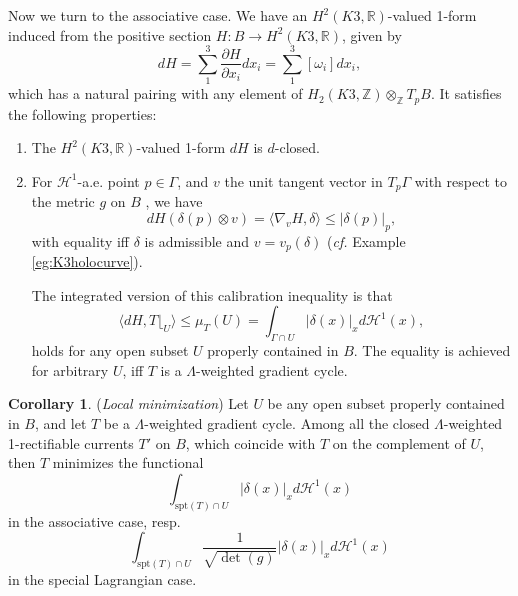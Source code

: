 \documentclass{article}
\theoremstyle{definition}
\newtheorem{cor}[thm]{Corollary}
\newcommand{\cf}{\emph{cf.} }
\newcommand{\R}{\mathbb{R}}
\newcommand{\Z}{\mathbb{Z}}
\begin{document}
	Now we turn to the associative case. We have an $H^2(K3,\R)$-valued 1-form induced from the positive section $H: B\to H^2(K3,\R)$, given by 
	\[
	dH= \sum_1^3 \frac{\partial H}{\partial x_i} dx_i =\sum_1^3 [\omega_i] dx_i,
	\]
	which has a natural pairing with any element of $H_2(K3, \Z)\otimes_\Z T_p B$.
	It satisfies the following properties:
	\begin{enumerate}
		\item  The  $H^2(K3,\R)$-valued 1-form $dH$ is $d$-closed.
		
		\item For $\mathcal{H}^1$-a.e. point $p\in \Gamma$, and $v$ the unit tangent vector in $T_p \Gamma$ with respect to the metric $g$ on $B$ , we have 
		\begin{equation}\label{eqn:pointwisecalibration2}
			dH (\delta(p) \otimes v )=\langle \nabla_v H, \delta\rangle     \leq |\delta(p)|_p,
		\end{equation}
		with equality iff $\delta$ is admissible and $v=v_p(\delta)$ (\cf Example \ref{eg:K3holocurve}).
		
		
		
		
		
		
		The integrated version of this calibration inequality is that
		\begin{equation}\label{eqn:integratedcalibration2}
			\langle  dH,   T \lfloor_U  \rangle \leq \mu_T(U)= \int_{\Gamma\cap U}  |\delta(x)|_x d\mathcal{H}^1 (x),
		\end{equation}
		holds for any open subset $U$ properly contained in $B$. The equality is achieved for arbitrary $U$, %
		iff $T$ is a $\Lambda$-weighted gradient cycle.
	\end{enumerate}
	
	

	
	\begin{cor}
		(\emph{Local minimization})
		Let $U$ be any open subset properly contained in $B$, and let $T$ be a $\Lambda$-weighted gradient cycle. Among all the closed $\Lambda$-weighted 1-rectifiable currents $T'$ on $B$, which coincide with $T$ on the complement of $U$, then $T$ minimizes the functional
		\[
		\int_{  \text{spt}(T)\cap U  } |\delta(x)|_x d\mathcal{H}^1(x)
		\]
		in the associative case, resp.
		\[
			\int_{  \text{spt}(T)\cap U  }  \frac{1}{  \sqrt{\det(g)} }      |\delta(x)|_x d\mathcal{H}^1(x)
		\]
		in the special Lagrangian case.
		
		
	\end{cor}
	
\end{document}

